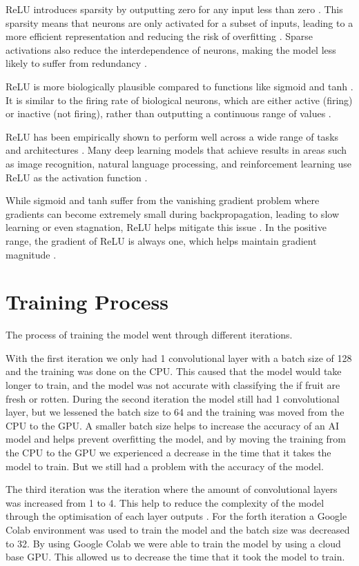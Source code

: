 \documentclass[conference]{IEEEtran}
\begin{document}
ReLU introduces sparsity by outputting zero for any input less than zero \cite{b31}. This sparsity means that neurons are only activated for a subset of inputs, leading to a more efficient representation and reducing the risk of overfitting \cite{b31}. Sparse activations also reduce the interdependence of neurons, making the model less likely to suffer from redundancy \cite{b31}.

ReLU is more biologically plausible compared to functions like sigmoid and tanh \cite{b30}. It is similar to the firing rate of biological neurons, which are either active (firing) or inactive (not firing), rather than outputting a continuous range of values \cite{b31}.

ReLU has been empirically shown to perform well across a wide range of tasks and architectures \cite{b32}. Many deep learning models that achieve results in areas such as image recognition, natural language processing, and reinforcement learning use ReLU as the activation function \cite{b32}.

While sigmoid and tanh suffer from the vanishing gradient problem where gradients can become extremely small during backpropagation, leading to slow learning or even stagnation, ReLU helps mitigate this issue \cite{b30}. In the positive range, the gradient of ReLU is always one, which helps maintain gradient magnitude \cite{b30}.

\section{Training Process}

The process of training the model went through different iterations.

With the first iteration we only had 1 convolutional layer with a batch size of 128 and the training was done on the CPU. This caused that the model would take longer to train, and the model was not accurate with classifying the if fruit are fresh or rotten. During the second iteration the model still had 1 convolutional layer, but we lessened the batch size to 64 and the training was moved from the CPU to the GPU. A smaller batch size helps to increase the accuracy of an AI model \cite{b2} and helps prevent overfitting the model, and by moving the training from the CPU to the GPU we experienced a decrease in the time that it takes the model to train. But we still had a problem with the accuracy of the model.

The third iteration was the iteration where the amount of convolutional layers was increased from 1 to 4. This help to reduce the complexity of the model through the optimisation of each layer outputs \cite{b3}. For the forth iteration a Google Colab environment was used to train the model and the batch size was decreased to 32. By using Google Colab we were able to train the model by using a cloud base GPU. This allowed us to decrease the time that it took the model to train.
\end{document}
